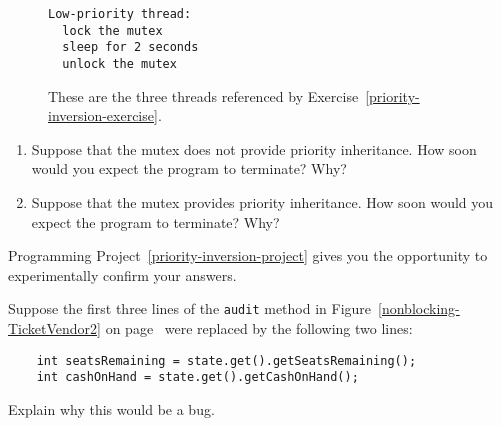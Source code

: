 \begin{chapterEnumerate}
\begin{figure}
\begin{verbatim}
Low-priority thread:
  lock the mutex
  sleep for 2 seconds
  unlock the mutex
\end{verbatim}
\caption{These are the three threads referenced by Exercise~\ref{priority-inversion-exercise}.}\label{priority-inversion-pseudocode}
\end{figure}
\begin{enumerate}
\item
Suppose that the mutex does not provide priority inheritance. How soon would you expect the program to terminate? Why?
\item
Suppose that the mutex provides priority inheritance.  How soon would you expect the program to terminate?  Why?
\end{enumerate}
Programming Project~\ref{priority-inversion-project} gives you the opportunity to experimentally confirm your answers.
\item
Suppose the first three lines of the \texttt{audit} method in Figure~\ref{nonblocking-TicketVendor2} on page~\pageref{nonblocking-TicketVendor2} were replaced by the following two lines:
\begin{verbatim}
    int seatsRemaining = state.get().getSeatsRemaining();
    int cashOnHand = state.get().getCashOnHand();
\end{verbatim}
Explain why this would be a bug.
\end{chapterEnumerate}

